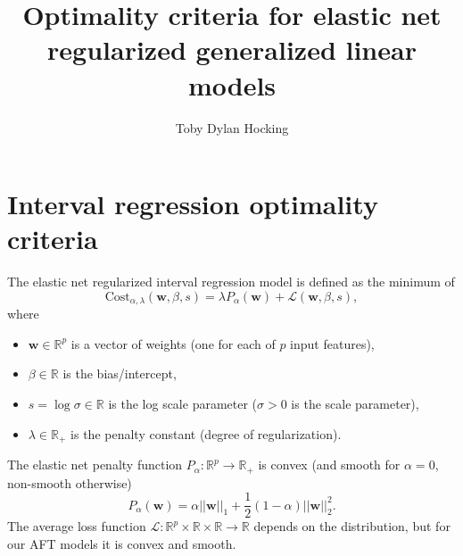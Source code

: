 \documentclass{article}
\newcommand{\Cost}{\text{Cost}}
\newcommand{\RR}{\mathbb R}
\begin{document}
\title{Optimality criteria for elastic net regularized generalized linear models}
\author{Toby Dylan Hocking}
\maketitle

\section{Interval regression optimality criteria}


The elastic net regularized interval regression model is defined as
the minimum of
\begin{equation}
  \label{eq:cost}
  \Cost_{\alpha,\lambda}(\mathbf w,\beta,s) = \lambda P_\alpha(\mathbf w) + 
  \mathcal L(\mathbf w, \beta, s),
\end{equation}
where
\begin{itemize}
\item  $\mathbf w\in\RR^p$ is a vector of weights
(one for each of $p$ input features),
\item $\beta\in\RR$ is the bias/intercept,
\item $s=\log\sigma\in\RR$ is the log scale parameter
($\sigma>0$ is the scale parameter), 
\item $\lambda\in\RR_+$ is the penalty constant (degree of
  regularization).
\end{itemize}
The elastic net penalty function $P_\alpha:\RR^p\rightarrow\RR_+$ is
convex (and smooth for $\alpha=0$, non-smooth otherwise)
\begin{equation}
  P_\alpha(\mathbf w) = \alpha||\mathbf w||_1 + \frac 1 2(1-\alpha)||\mathbf w||_2^2.
\end{equation}
The average loss function
$\mathcal L:\RR^p\times \RR\times \RR\rightarrow \RR$ depends on the
distribution, but for our AFT models it is convex and smooth.
\end{document}
